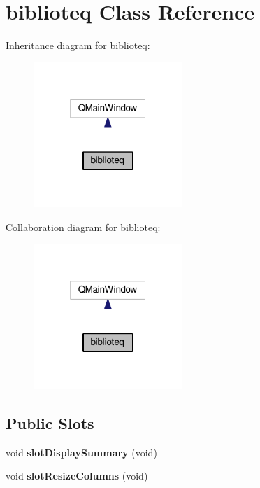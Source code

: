 \hypertarget{classbiblioteq}{}\section{biblioteq Class Reference}
\label{classbiblioteq}


Inheritance diagram for biblioteq\+:
\nopagebreak
\begin{figure}[H]
\begin{center}
\leavevmode
\includegraphics[width=160pt]{classbiblioteq__inherit__graph}
\end{center}
\end{figure}


Collaboration diagram for biblioteq\+:
\nopagebreak
\begin{figure}[H]
\begin{center}
\leavevmode
\includegraphics[width=160pt]{classbiblioteq__coll__graph}
\end{center}
\end{figure}
\subsection*{Public Slots}
\begin{DoxyCompactItemize}
\item 
void {\bfseries slot\+Display\+Summary} (void)\hypertarget{classbiblioteq_a857a2b520a0011809ab4ba9f6684ae6e}{}\label{classbiblioteq_a857a2b520a0011809ab4ba9f6684ae6e}

\item 
void {\bfseries slot\+Resize\+Columns} (void)\hypertarget{classbiblioteq_a2b5613a73c87cbd2efb1b63701c5a453}{}\label{classbiblioteq_a2b5613a73c87cbd2efb1b63701c5a453}

\end{DoxyCompactItemize}
